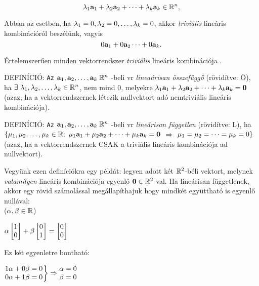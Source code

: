 \documentclass[a4paper,11.5pt]{article}
\begin{document}
	\[\lambda _1\textbf{a}_1+\lambda _2\textbf{a} _2+\dots+\lambda _k \textbf{a}_k \in \mathbb{R}^{n},\]
	
	\noindent Abban az esetben, ha  $\lambda_1=0,  \lambda_2=0, \ldots, \lambda_k=0$, akkor \emph{triviális} lineáris kombinációról beszélünk, vagyis
	\[0\textbf{a} _1+0\textbf{a}_2\dots+0\textbf{a} _k.\]
	
	\noindent Értelemszerűen minden vektorrendszer \emph{triviális} lineáris kombinációja \0.
	
	
	DEFINÍCIÓ: {\tt Az} $\textbf{a} _1, \textbf{a} _2, \dots, \textbf{a} _k \;  \mathbb{R}^{n}${ -beli vr}
	\emph{lineaárisan összefüggő} (rövidítve: Ö), { ha} 
	$\exists~ \lambda _1, \lambda _2, \dots, \lambda _k \in  \mathbb{R}^{n}$, { nem mind} $0$, 
	{ melyekre} $\lambda _1\textbf{a} _1+\lambda _2 \textbf{a} _2+\dots+\lambda _k\textbf{a}_ k = \textbf{0}$ (azaz, ha a
	vektorrendszernek létezik nullvektort adó { nemtriviális} lineáris
	kombinációja). 
		
	DEFINÍCIÓ: {\tt Az} $\textbf{a} _1, \textbf{a} _2, \dots, \textbf{a} _k \;  \mathbb{R}^{n}${ -beli vr}
	\emph{lineárisan független}  (rövidítve: L), { ha} 
	$\{\mu _1, \mu _2, \dots, \mu _k \in  \mathbb{R} ;~ 
	\mu _1\textbf{a} _1+\mu _2 \textbf{a} _2+\dots+\mu_k\textbf{a}_ k = \textbf{0}$ $\Rightarrow $ $\mu _1 =\mu _2 = \dots = \mu _k = 0\}$
	(azaz, ha a vektorrendszernek CSAK { a triviális} lineáris kombinációja ad
	nullvektort). 
	
	Vegyünk ezen definíciókra egy példát: legyen adott két $\mathbb{R}^2$-béli vektort, melynek \emph{valamilyen} lineáris kombinációja egyenlő $\textbf{0} \in \mathbb{R}^2$-val. Ha lineárisan függetlenek, akkor egy rövid számolással megállapíthajuk hogy mindkét együttható is egyenlő nullával:\\  ($\alpha, \beta \in \mathbb{R}$)
	
	\begin{center}
		$\alpha
	\begin{bmatrix}
		1\s\\
		0\s \\
	\end{bmatrix}+
	\beta
	\begin{bmatrix}
	0\s\\
	1\s \\
	\end{bmatrix}=
	\begin{bmatrix}
	0\s\\
	0\s \\
	\end{bmatrix}$
	\end{center}
	
	\noindent Ez két egyenletre bontható:
	
	\begin{center}
		$\left.\begin{matrix}
		1\alpha+0\beta = 0\s \\
		0\alpha+1\beta = 0\s \\
	\end{matrix}\right\} \Rightarrow
	\begin{matrix}
		\alpha=0\s\\
		\beta=0\s\\
	\end{matrix}$
	\end{center}
	
\end{document}
